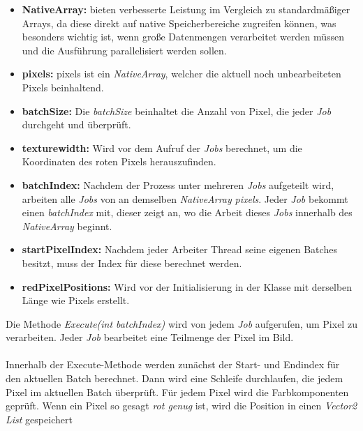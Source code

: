 \begin{itemize}
    \item \textbf{NativeArray:} bieten verbesserte Leistung im Vergleich zu standardmäßiger Arrays, da diese direkt auf native Speicherbereiche zugreifen können, was besonders wichtig ist, wenn große Datenmengen verarbeitet werden müssen und die Ausführung parallelisiert werden sollen.
    \item \textbf{pixels:} pixels ist ein \textit{NativeArray}, welcher die aktuell noch unbearbeiteten Pixels beinhaltend.
    \item \textbf{batchSize:} Die \textit{batchSize} beinhaltet die Anzahl von Pixel, die jeder \textit{Job} durchgeht und überprüft.
    \item \textbf{texturewidth:} Wird vor dem Aufruf der \textit{Jobs} berechnet, um die Koordinaten des roten Pixels herauszufinden.
    \item \textbf{batchIndex:} Nachdem der Prozess unter mehreren \textit{Jobs} aufgeteilt wird, arbeiten alle \textit{Jobs} von an demselben \textit{NativeArray} \textit{pixels}. Jeder \textit{Job} bekommt einen \textit{batchIndex} mit, dieser zeigt an, wo die Arbeit dieses \textit{Jobs} innerhalb des \textit{NativeArray} beginnt.
    \item \textbf{startPixelIndex:} Nachdem jeder Arbeiter Thread seine eigenen Batches besitzt, muss der Index für diese berechnet werden.
    \item \textbf{redPixelPositions:} Wird vor der Initialisierung in der Klasse mit derselben Länge wie Pixels erstellt.
\end{itemize}
Die Methode \textit{Execute(int batchIndex)} wird von jedem \textit{Job} aufgerufen, um Pixel zu verarbeiten. Jeder \textit{Job} bearbeitet eine Teilmenge der Pixel im Bild.\\
\\
Innerhalb der Execute-Methode werden zunächst der Start- und Endindex für den aktuellen Batch berechnet. Dann wird eine Schleife durchlaufen, die jedem Pixel im aktuellen Batch überprüft. Für jedem Pixel wird die Farbkomponenten geprüft. Wenn ein Pixel so gesagt \textit{rot genug} ist, wird die Position in einen \textit{Vector2 List} gespeichert

